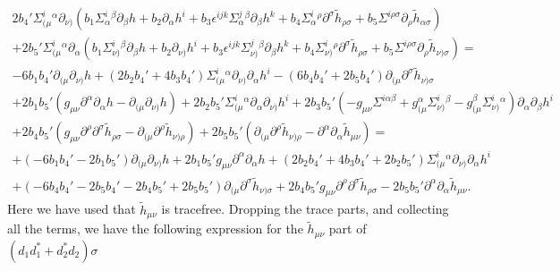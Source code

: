 \documentclass[10pt]{report}
\theoremstyle{definition}
\begin{document}
  \begin{align}\nonumber
  2b_4' \Sigma^i_{(\mu}{}^\alpha \partial_{\nu)}(b_1 \Sigma^i_\alpha{}^\beta \partial_\beta h + b_2 \partial_\alpha h^i + b_3 \epsilon^{ijk} \Sigma^j_\alpha{}^\beta \partial_\beta h^k + b_4 \Sigma^i_\alpha{}^\rho \partial^\sigma \tilde{h}_{\rho\sigma} + b_5 \Sigma^{i\rho\sigma}  \partial_\rho \tilde{h}_{\alpha\sigma}) \\ \nonumber
  +  2b_5' \Sigma^i_{(\mu}{}^\alpha \partial_\alpha (b_1 \Sigma^i_{\nu)}{}^\beta \partial_\beta h + b_2 \partial_{\nu)} h^i + b_3 \epsilon^{ijk} \Sigma^j_{\nu)}{}^\beta \partial_\beta h^k + b_4 \Sigma^i_{\nu)}{}^\rho \partial^\sigma \tilde{h}_{\rho\sigma} + b_5 \Sigma^{i\rho\sigma}  \partial_\rho \tilde{h}_{\nu)\sigma}) = \\ \nonumber
 -6 b_1 b_4' \partial_{(\mu} \partial_{\nu)} h + (2b_2 b_4' + 4b_3 b_4' ) \Sigma^i_{(\mu}{}^\alpha \partial_{\nu)} \partial_\alpha h^i
  -(6 b_4 b_4'  + 2b_5 b_4' ) \partial_{(\mu} \partial^\sigma \tilde{h}_{\nu)\sigma} \\ \nonumber
  +2 b_1b_5' ( g_{\mu\nu} \partial^\alpha\partial_\alpha h - \partial_{(\mu} \partial_{\nu)} h) 
  +  2b_2 b_5' \Sigma^i_{(\mu}{}^\alpha \partial_\alpha \partial_{\nu)} h^i 
  +  2b_3 b_5'  ( - g_{\mu\nu} \Sigma^{i\alpha\beta} + g_{(\mu}^\alpha  \Sigma^{i}_{\nu)}{}^{\beta} - g_{(\mu}^\beta \Sigma^{i}_{\nu)}{}^\alpha) \partial_\alpha  \partial_\beta h^i
  \\ \nonumber
  +  2b_4 b_5' ( g_{\mu\nu} \partial^\rho\partial^\sigma \tilde{h}_{\rho\sigma} - \partial_{(\mu} \partial^\rho \tilde{h}_{\nu)\rho}) 
  +  2 b_5 b_5' (\partial_{(\mu} \partial^\rho \tilde{h}_{\nu)\rho} - \partial^\alpha \partial_\alpha \tilde{h}_{\mu\nu}) =  \\ \nonumber
  +( -6 b_1 b_4'  - 2 b_1b_5' ) \partial_{(\mu} \partial_{\nu)} h  +2 b_1b_5' g_{\mu\nu} \partial^\alpha\partial_\alpha h + (2b_2 b_4' + 4b_3 b_4' +  2b_2 b_5' ) \Sigma^i_{(\mu}{}^\alpha \partial_{\nu)} \partial_\alpha h^i \\ \nonumber
  +(-6 b_4 b_4'  - 2b_5 b_4' -  2b_4 b_5'+  2 b_5 b_5') \partial_{(\mu} \partial^\sigma \tilde{h}_{\nu)\sigma} 
  +  2b_4 b_5'  g_{\mu\nu} \partial^\rho\partial^\sigma \tilde{h}_{\rho\sigma} 
  -  2 b_5 b_5'  \partial^\alpha \partial_\alpha \tilde{h}_{\mu\nu}.
     \end{align}
Here we have used that $\tilde{h}_{\mu\nu}$ is tracefree. Dropping the trace parts, and collecting all the terms, we have the following expression for the $\tilde{h}_{\mu\nu}$ part of $(d_1 d_1^* +d_2^* d_2 ) \sigma$
\end{document}
